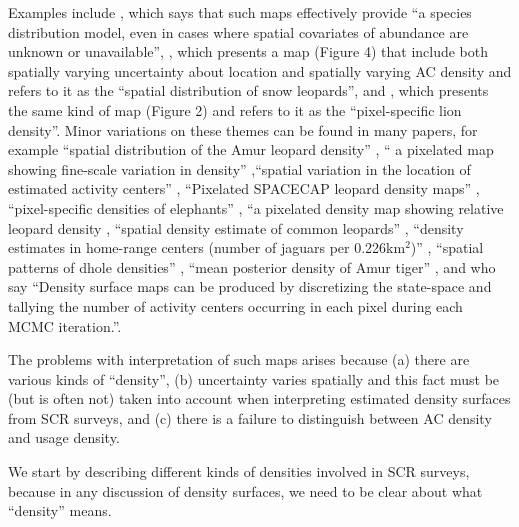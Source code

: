 \documentclass[10pt,a4paper]{article}
\begin{document}
Examples include \cite{Dorazio+Karanth:17}, which says that such maps effectively provide  ``a species distribution model, even in cases where spatial covariates of abundance are unknown or unavailable'', \cite{Alexander+al:15}, which presents a map (Figure 4) that include both spatially varying uncertainty about location and spatially varying AC density and refers to it as the ``spatial distribution of snow leopards'', and \cite{Elliot+Gopalaswamy:16}, which presents the same kind of map (Figure 2) and refers to it as the ``pixel-specific lion density''. Minor variations on these themes can be found in many papers, for example ``spatial distribution of the Amur leopard density'' \citep{Qi2015}, `` a pixelated map showing fine-scale variation in density'' \citep{Fouche2020},``spatial variation in the location of estimated activity centers'' \citep{Blanc2013}, ``Pixelated SPACECAP leopard density maps'' \citep{Devens2021}, ``pixel-specific densities of elephants'' \citep{Goswami2019}, ``a pixelated density map showing relative leopard density \citep{Kandel2020}, ``spatial density estimate of common leopards'' \citep{Goldberg2015}, ``density estimates in home-range centers (number of jaguars per 0.226km$^2$)'' \citep{Lavariega2020}, ``spatial patterns of dhole densities'' \citep{Srivathsa2021}, ``mean posterior density of Amur tiger'' \citep{Xiao2016}, and \cite{Chandler+Royle:13} who say ``Density surface maps can be produced by discretizing the state-space and tallying the number of activity centers occurring in each pixel during each MCMC iteration.''.

The problems with interpretation of such maps arises because (a) there are various kinds of ``density'', (b) uncertainty varies spatially and this fact must be (but is often not) taken into account when interpreting estimated density surfaces from SCR surveys, and (c) there is a failure to distinguish between AC density and usage density. 

We start by describing different kinds of densities involved in SCR surveys, because in any discussion of density surfaces, we need to be clear about what ``density'' means. %
\end{document}
